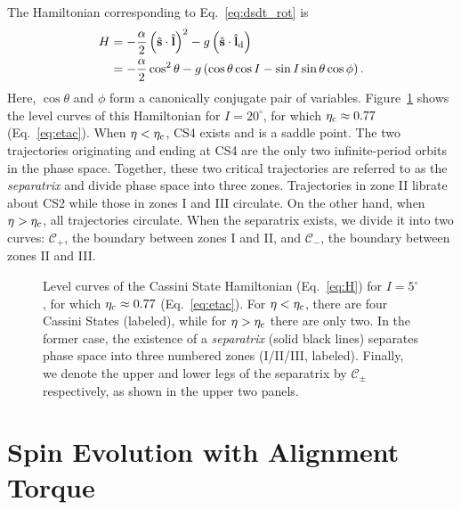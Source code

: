 \documentclass[
        fleqn,
        usenatbib,
    ]{mnras}
\newcommand*{\p}[1]{\left(#1\right)}
\newcommand*{\uv}[1]{\hat{\mathbf{#1}}}
\begin{document}
The Hamiltonian corresponding to Eq.~\eqref{eq:dsdt_rot} is
\begin{align}
    H &= -\frac{\alpha}{2}\p{\uv{s} \cdot \uv{l}}^2
            - g\p{\uv{s} \cdot \uv{l}_{\rm d}}\nonumber\\
        &= -\frac{\alpha}{2} \cos^2\theta
            - g\p{\cos\theta \cos I - \sin I \sin\theta \cos \phi}.\label{eq:H}
\end{align}
Here, $\cos \theta$ and $\phi$ form a canonically conjugate pair of variables.
Figure~\ref{fig:1contours} shows the level curves of this Hamiltonian for $I =
20^\circ$, for which $\eta_{\rm c} \approx 0.77$ (Eq.~\ref{eq:etac}). When $\eta
< \eta_{\rm c}$, CS4 exists and is a saddle point. The two trajectories
originating and ending at CS4 are the only two infinite-period orbits in the
phase space. Together, these two critical trajectories are referred to as the
\emph{separatrix} and divide phase space into three zones. Trajectories in zone
II librate about CS2 while those in zones I and III circulate. On the other
hand, when $\eta > \eta_{\rm c}$, all trajectories circulate. When the
separatrix exists, we divide it into two curves: $\mathcal{C}_+$, the boundary
between zones I and II, and $\mathcal{C}_-$, the boundary between zones II and
III\@.
\begin{figure}
    \centering
    \caption{Level curves of the Cassini State Hamiltonian (Eq.~\ref{eq:H}) for
    $I = 5^\circ$, for which $\eta_{\rm c} \approx 0.77$ (Eq.~\ref{eq:etac}).
    For $\eta < \eta_{\rm c}$, there are four Cassini States (labeled), while
    for $\eta > \eta_{\rm c}$ there are only two. In the former case, the
    existence of a \emph{separatrix} (solid black lines) separates phase space
    into three numbered zones (I/II/III, labeled). Finally, we denote the upper
    and lower legs of the separatrix by $\mathcal{C}_{\pm}$ respectively, as
    shown in the upper two panels.}\label{fig:1contours}
\end{figure}

\section{Spin Evolution with Alignment Torque}\label{ss:toy_model}
\end{document}
